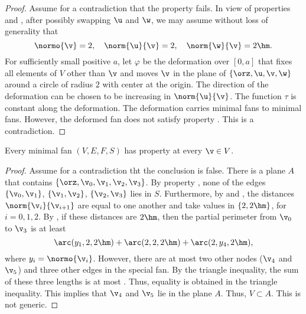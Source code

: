 \begin{proof} Assume for a contradiction that the property fails.  In
view of properties  and ,
after possibly swapping $\u$ and $\w$, we may assume without loss of
generality that
\begin{displaymath}
\normo{\v}=2,\quad \norm{\u}{\v}=2,\quad \norm{\w}{\v}=2\hm.
\end{displaymath}
For sufficiently small positive $a$, let $\varphi$ be the deformation
over $[0,a]$ that fixes all elements of $V$ other than $\v$ and moves
$\v$ in the plane of $\{\orz,\u,\v,\w\}$ around a circle of radius $2$
with center at the origin.  The direction of the deformation can be
chosen to be increasing in $\norm{\u}{\v}$.  The function $\tau$ is
constant along the deformation.  The deformation carries minimal fans
to minimal fans.  However, the deformed fan does not satisfy property
.  This is a contradiction.
\end{proof}




\begin{lemma}[] Every minimal fan $(V,E,F,S)$ has property
 at every $\v\in V$.
\end{lemma}

\begin{proof} %
Assume for a contradiction tht the conclusion is false.  There is a
plane $A$ that contains $\{\orz,\v_0,\v_1,\v_2,\v_3\}$.  By property
, none of the edges $\{\v_0,\v_1\}$, $\{\v_1,\v_2\}$,
$\{\v_2,\v_3\}$ lies in $S$.  Furthermore, by 
and , the distances $\norm{\v_i}{\v_{i+1}}$ are equal
to one another and take values in $\{2,2\hm\}$, for $i=0,1,2$.  By
, if these distances are $2\hm$, then the partial
perimeter from $\v_0$ to $\v_3$ is at least
\begin{equation}\label{eqn:3side}
\arc(y_1,2,2\hm)+\arc(2,2,2\hm)+\arc(2,y_4,2\hm),
\end{equation}
where $y_i=\normo{\v_i}$.  However, there are at most two other nodes
($\v_4$ and $\v_5$) and three other edges in the special fan.  By the
triangle inequality, the sum of these three lengths is at most
.  Thus, equality is obtained in the triangle
inequality.  This implies that $\v_4$ and $\v_5$ lie in the plane $A$.
Thus, $V\subset A$.  This is not generic.
\end{proof}

